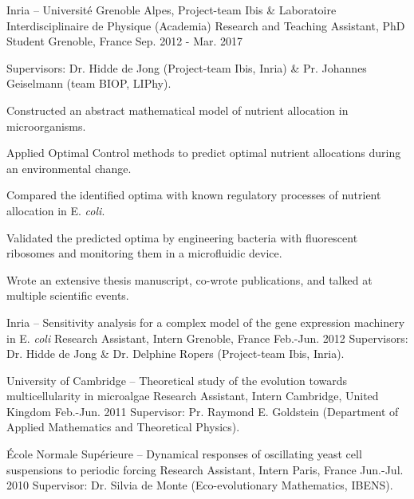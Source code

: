 \begin{cventries}
  \cventry
    {Inria -- Université Grenoble Alpes, Project-team Ibis \& Laboratoire Interdisciplinaire de Physique (Academia)} %
    {Research and Teaching Assistant, PhD Student} %
    {Grenoble, France} %
    {Sep. 2012 - Mar. 2017} %
    {
	Supervisors: Dr. Hidde de Jong (Project-team Ibis, Inria) \& Pr. Johannes Geiselmann (team BIOP, LIPhy).
    \vspace{0.5cm}
	\begin{cvitems} %
        \item {Constructed an abstract mathematical model of nutrient allocation in microorganisms.}
        \item {Applied Optimal Control methods to predict optimal nutrient allocations during an environmental change.}
        \item {Compared the identified optima with known regulatory processes of nutrient allocation in E. \textit{coli}.}
		\item {Validated the predicted optima by engineering bacteria with fluorescent ribosomes and monitoring them in a microfluidic device.}
		\item {Wrote an extensive thesis manuscript, co-wrote publications, and talked at multiple scientific events.}
	\end{cvitems}
    }
\end{cventries}    


\begin{cventries}
  \cventry
    {Inria -- Sensitivity analysis for a complex model of the gene expression machinery in E. \textit{coli}} %
    {Research Assistant, Intern} %
    {Grenoble, France} %
    {Feb.-Jun. 2012} %
    {
    Supervisors: Dr. Hidde de Jong \& Dr. Delphine Ropers (Project-team Ibis, Inria).
    }
    
  \cventry
    {University of Cambridge -- Theoretical study of the evolution towards multicellularity in microalgae} %
    {Research Assistant, Intern} %
    {Cambridge, United Kingdom} %
    {Feb.-Jun. 2011} %
    {
	Supervisor: Pr. Raymond E. Goldstein (Department of Applied Mathematics and Theoretical Physics).
    }
    
  \cventry
    {École Normale Supérieure -- Dynamical responses of oscillating yeast cell suspensions to periodic forcing} %
    {Research Assistant, Intern} %
    {Paris, France} %
    {Jun.-Jul. 2010} %
    {
	Supervisor: Dr. Silvia de Monte (Eco-evolutionary Mathematics, IBENS).
    }

\end{cventries}
